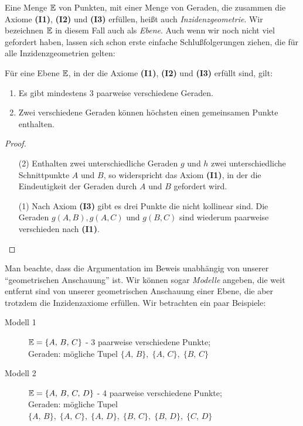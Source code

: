 Eine Menge $\mathbb E$ von Punkten, mit einer Menge %
von Geraden, die zusammen die Axiome {\bf(I1)}, {\bf(I2)} und {\bf(I3)} erfüllen, heißt auch {\em
Inzidenzgeometrie}. Wir bezeichnen $\mathbb E$ in diesem Fall auch als {\em Ebene}.
Auch wenn wir noch nicht viel gefordert haben, lassen sich schon erste einfache Schlußfolgerungen
ziehen, die für alle Inzidenzgeometrien gelten:

\begin{thm}
    Für eine Ebene $\mathbb E$, in der die Axiome {\bf(I1)}, {\bf(I2)} und {\bf(I3)} erfüllt sind, gilt:
    \begin{enumerate}
        \item Es gibt mindestens 3 paarweise verschiedene Geraden.

        \item Zwei verschiedene Geraden können höchsten einen gemeinsamen Punkte enthalten.
    \end{enumerate}
\end{thm}

\begin{proof}
    \begin{enumerate}
    \item[(2)] Enthalten zwei unterschiedliche Geraden $g$ und $h$ zwei unterschiedliche
        Schnittpunkte $A$ und $B$, so widerspricht das Axiom {\bf(I1)}, in der die Eindeutigkeit der
        Geraden durch $A$ und $B$ gefordert wird.

    \item[(1)] Nach Axiom {\bf(I3)} gibt es drei Punkte die nicht kollinear sind. Die Geraden
        $g(A,B), g(A,C)$ und $g(B,C)$ sind wiederum paarweise verschieden nach {\bf(I1)}.
    \end{enumerate}
\end{proof}

Man beachte, dass die Argumentation im Beweis unabhängig von unserer "`geometrischen Anschauung"'
ist. Wir können sogar {\em Modelle} angeben, die weit entfernt sind von unserer geometrischen
Anschauung einer Ebene, die aber trotzdem die Inzidenzaxiome erfüllen. Wir betrachten ein paar
Beispiele:

\begin{description}
    \item[Modell 1] $\mathbb E=\{A,\,B,\,C\}$ - 3 paarweise verschiedene Punkte;\\
        Geraden: mögliche Tupel $\{A,\,B\},\;\{A,\,C\},\;\{B,\,C\}$

    \item[Modell 2] \label{Modell2} $\mathbb E=\{A,\,B,\,C,\,D\}$ - 4 paarweise verschiedene Punkte;\\
        Geraden: mögliche Tupel $\{A,\,B\},\; \{A,\,C\},\; \{A,\,D\},\; \{B,\,C\},\; \{B,\,D\},\;
        \{C,\,D\}$
\end{description}

